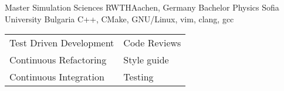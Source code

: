 {Master }
{Simulation Sciences}
{RWTH}{Aachen, Germany}
{Bachelor}
{Physics}
{Sofia University}
{Bulgaria}
\vspace{-0.4cm}
C++, CMake, GNU/Linux, vim, clang, gcc
\begin{tabular}{ l l}
 Test Driven Development & Code Reviews \\
 Continuous Refactoring & Style guide \\
 Continuous Integration & Testing \\
\end{tabular}\\

